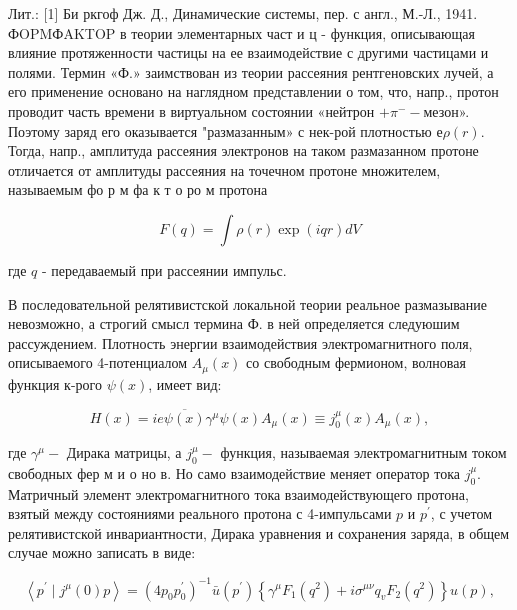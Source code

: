 \documentclass[10pt]{article}
\begin{document}
Лит.: [1] Би ркгоф Дж. Д., Динамические системы, пер. с англ., М.-Л., 1941. ФOPMФAKTOP в теории элементарных част и ц - функция, описывающая влияние протяженности частицы на ее взаимодействие с другими частицами и полями. Термин «Ф.» заимствован из теории рассеяния рентгеновских лучей, а его применение основано на наглядном представлении о том, что, напр., протон проводит часть времени в виртуальном состоянии «нейтрон $+\pi^{-}-$мезон». Поэтому заряд его оказывается "размазанным» с нек-рой плотностью $е \rho(r)$. Тогда, напр., амплитуда рассеяния электронов на таком размазанном протоне отличается от амплитуды рассеяния на точечном протоне множителем, называемым фо р м фа к т о ро м протона



\[

F(q)=\int \rho(r) \exp (i q r) d V

\]



где $q$ - передаваемый при рассеянии импульс.



В последовательной релятивистской локальной теории реальное размазывание невозможно, а строгий смысл термина Ф. в ней определяется следуюшим рассуждением. Плотность энергии взаимодействия электромагнитного поля, описываемого 4-потенциалом $A_{\mu}(x)$ со свободным фермионом, волновая функция к-рого $\psi(x)$, имеет вид:



\[

H(x)=i e \overline{\psi(x)} \gamma^{\mu} \psi(x) A_{\mu}(x) \equiv j_{0}^{\mu}(x) A_{\mu}(x),

\]



где $\gamma^{\mu}-$ Дирака матрицы, а $j_{0}^{\mu}-$ функция, называемая электромагнитным током свободных фер м и о но в. Но само взаимодействие меняет оператор тока $j_{0}^{\mu}$. Матричный элемент электромагнитного тока взаимодействующего протона, взятый между состояниями реального протона с 4-импульсами $p$ и $p^{\prime}$, с учетом релятивистской инвариантности, Дирака уравнения и сохранения заряда, в общем случае можно записать в виде:



\[

\left\langle p^{\prime} \mid j^{\mu}(0) p\right\rangle=\left(4 p_{0} p_{0}^{\prime}\right)^{-1} \bar{u}\left(p^{\prime}\right)\left\{\gamma^{\mu} F_{1}\left(q^{2}\right)+i \sigma^{\mu \nu} q_{v} F_{2}\left(q^{2}\right)\right\} u(p),

\]
\end{document}
